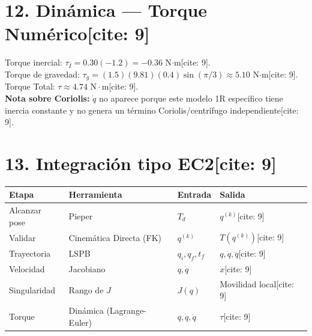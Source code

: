 \documentclass[11pt, a4paper]{article}
\begin{document}
\section*{12. Dinámica — Torque Numérico[cite: 9]}
Torque inercial: $\tau_I = 0.30(-1.2) = -0.36$ N$\cdot$m[cite: 9]. \\
Torque de gravedad: $\tau_g = (1.5)(9.81)(0.4)\sin(\pi/3) \approx 5.10$ N$\cdot$m[cite: 9]. \\
Torque Total: $\boxed{ \tau \approx 4.74 \text{ N}\cdot\text{m} }$[cite: 9]. \\
\textbf{Nota sobre Coriolis:} $\dot{q}$ no aparece porque este modelo 1R específico tiene inercia constante y no genera un término Coriolis/centrífugo independiente[cite: 9].

\section*{13. Integración tipo EC2[cite: 9]}
\begin{center}
\renewcommand{\arraystretch}{1.3}
\begin{tabularx}{0.9\textwidth}{|l|>{\raggedright\arraybackslash}X|l|l|}
\hline
\rowcolor{ucbblue!10} \textbf{Etapa} & \textbf{Herramienta} & \textbf{Entrada} & \textbf{Salida} \\ \hline
Alcanzar pose & Pieper & $T_d$ & $q^{(k)}$[cite: 9]\\ \hline
Validar & Cinemática Directa (FK) & $q^{(k)}$ & $T(q^{(k)})$[cite: 9]\\ \hline
Trayectoria & LSPB & $q_i, q_f, t_f$ & $q, \dot{q}, \ddot{q}$[cite: 9]\\ \hline
Velocidad & Jacobiano & $q, \dot{q}$ & $\dot{x}$[cite: 9]\\ \hline
Singularidad & Rango de $J$ & $J(q)$ & Movilidad local[cite: 9]\\ \hline
Torque & Dinámica (Lagrange-Euler) & $q, \dot{q}, \ddot{q}$ & $\tau$[cite: 9]\\ \hline
\end{tabularx}
\end{center}
\end{document}
